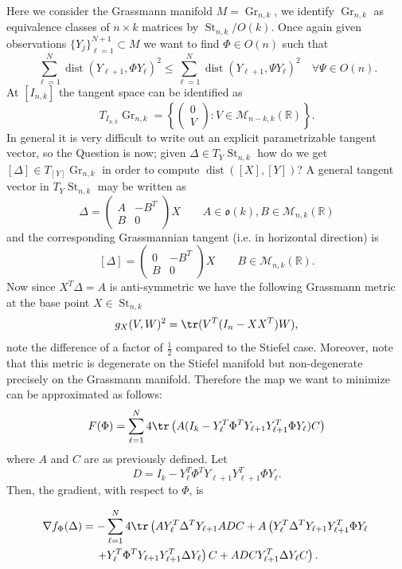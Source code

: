 \documentclass[12pt,a4paper]{article}
\theoremstyle{definition}
\theoremstyle{remark}
\DeclareMathOperator{\dist}{dist}
\DeclareMathOperator{\St}{St}
\DeclareMathOperator{\Gr}{Gr}
\begin{document}
Here we consider the Grassmann manifold $M=\Gr_{n,k}$, we identify $\Gr_{n,k}$ as equivalence classes of $n\times k$ matrices by $\St_{n,k}/O(k)$. Once again given observations $\{Y_j\}_{\ell=1}^{N+1}\subset M$ we want to find $\Phi \in O(n)$ such that
\[
\sum_{\ell=1}^N \dist(Y_{\ell+1},\Phi Y_{\ell})^2 \leq \sum_{\ell=1}^N \dist(Y_{\ell+1},\Psi Y_{\ell})^2 \quad \forall \Psi  \in O(n).
\]
At $[I_{n,k}]$ the tangent space can be identified as
\[
T_{I_{n,k}}\Gr_{n,k}=\left\{\begin{pmatrix}
0\\ V
\end{pmatrix}:V\in \mathcal{M}_{n-k,k}(\mathbb{R})\right\}.
\]
In general it is very difficult to write out an explicit parametrizable tangent vector, so the Question is now; given $\Delta\in T_Y \St_{n,k}$ how do we get $[\Delta]\in T_{[Y]}\Gr_{n,k}$ in order to compute $\dist([X],[Y])$? A general tangent vector in $T_{Y}\St_{n,k}$ may be written as
\[
\Delta = \begin{pmatrix}
A& -B^T\\B& 0
\end{pmatrix} X\qquad A\in \mathfrak{o}(k), B\in \mathcal{M}_{n,k}(\mathbb{R})
\]
and the corresponding Grassmannian tangent (i.e. in horizontal direction) is
\[
[\Delta] = \begin{pmatrix}
0& -B^T\\B& 0
\end{pmatrix} X\qquad B\in \mathcal{M}_{n,k}(\mathbb{R}).
\]
Now since $X^T \Delta=A$ is anti-symmetric we have the following Grassmann metric at the base point $X\in \St_{n,k}$
\[
g_X(V,W)^2=\tr(V^T(I_n-XX^T)W),
\]
note the difference of a factor of $\frac{1}{2}$ compared to the Stiefel case. Moreover, note that this metric is degenerate on the Stiefel manifold but non-degenerate precisely on the Grassmann manifold. Therefore the map we want to minimize can be approximated as follows:
\[
F(\Phi)=\sum_{\ell=1}^N 4 \tr\left(A (I_k-Y_{\ell}^T\Phi^T Y_{\ell+1}Y_{\ell+1}^T \Phi Y_{\ell})C \right)
\]
where $A$ and $C$ are as previously defined. Let
\[
D=I_k-Y_{\ell}^T\Phi^T Y_{\ell+1}Y_{\ell+1}^T \Phi Y_{\ell}.
\] 
Then, the gradient, with respect to $\Phi$, is

\begin{multline*}
\nabla f_\Phi(\Delta)= -\sum_{\ell=1}^N 4 \tr \left(A  Y_\ell^T \Delta^T Y_{\ell+1} AD C+ A \left( Y_\ell^T\Delta^T Y_{\ell+1} Y_{\ell+1}^T \Phi Y_{\ell} \right.\right.\\
\left.\left. + Y_\ell^T \Phi^T Y_{\ell+1} Y_{\ell+1}^T \Delta Y_{\ell}\right)C +ADCY_{\ell+1}^T \Delta Y_{\ell}C\right).
\end{multline*}
\end{document}
